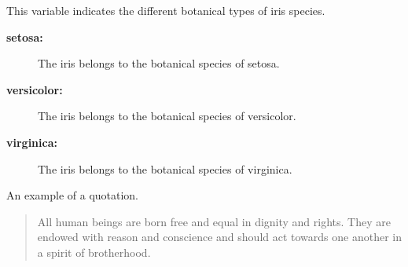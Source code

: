 \documentclass[
  freefonts, nologo]{amnestyreport}
\begin{document}
This variable indicates the different botanical types of iris species.

\begin{description}
\item[\textbf{setosa:}] The iris belongs to the botanical species of setosa. 
\item[\textbf{versicolor:}]  The iris belongs to the botanical species of versicolor. 
\item[\textbf{virginica:}] The iris belongs to the botanical species of virginica. 
\end{description}

An example of a quotation.

\begin{quote}
All human beings are born free and equal in dignity and rights. They are
endowed with reason and conscience and should act towards one another in
a spirit of brotherhood.

\end{quote}

\backmatter
\end{document}
